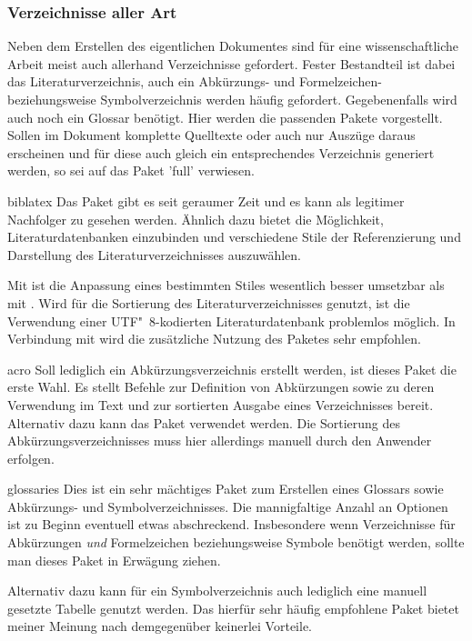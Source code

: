 \subsubsection{Verzeichnisse aller Art}
Neben dem Erstellen des eigentlichen Dokumentes sind für eine wissenschaftliche 
Arbeit meist auch allerhand Verzeichnisse gefordert. Fester Bestandteil ist 
dabei das Literaturverzeichnis, auch ein Abkürzungs- und Formelzeichen- 
beziehungsweise Symbolverzeichnis werden häufig gefordert. Gegebenenfalls wird 
auch noch ein Glossar benötigt. Hier werden die passenden Pakete vorgestellt. 
Sollen im Dokument komplette Quelltexte oder auch nur Auszüge daraus erscheinen 
und für diese auch gleich ein entsprechendes Verzeichnis generiert werden, so 
sei auf das Paket 'full' verwiesen.

\begin{packages}
\item[biblatex]
  Das Paket gibt es seit geraumer Zeit und es kann als legitimer Nachfolger zu 
   gesehen werden. Ähnlich dazu bietet  
  die Möglichkeit, Literaturdatenbanken einzubinden und verschiedene Stile der 
  Referenzierung und Darstellung des Literaturverzeichnisses auszuwählen. 
  
  Mit  ist die Anpassung eines bestimmten Stiles wesentlich 
  besser umsetzbar als mit . Wird  für die 
  Sortierung des Literaturverzeichnisses genutzt, ist die Verwendung einer 
  UTF"~8-kodierten Literaturdatenbank problemlos möglich. In Verbindung mit 
   wird die zusätzliche Nutzung des Paketes 
   sehr empfohlen.
\item[acro]
  Soll lediglich ein Abkürzungsverzeichnis erstellt werden, ist dieses Paket 
  die erste Wahl. Es stellt Befehle zur Definition von Abkürzungen sowie zu 
  deren Verwendung im Text und zur sortierten Ausgabe eines Verzeichnisses 
  bereit. Alternativ dazu kann das Paket  verwendet werden. 
  Die Sortierung des Abkürzungsverzeichnisses muss hier allerdings manuell 
  durch den Anwender erfolgen.
\item[glossaries]%
  Dies ist ein sehr mächtiges Paket zum Erstellen eines Glossars sowie 
  Abkürzungs- und Symbolverzeichnisses. Die mannigfaltige Anzahl an Optionen 
  ist zu Beginn eventuell etwas abschreckend. Insbesondere wenn Verzeichnisse 
  für Abkürzungen \emph{und} Formelzeichen beziehungsweise Symbole benötigt 
  werden, sollte man dieses Paket in Erwägung ziehen.
  
  Alternativ dazu kann für ein Symbolverzeichnis auch lediglich eine manuell 
  gesetzte Tabelle genutzt werden. Das hierfür sehr häufig empfohlene Paket 
   bietet meiner Meinung nach demgegenüber keinerlei Vorteile.
\end{packages}


